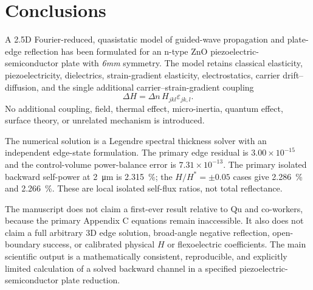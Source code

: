 \section{Conclusions}\label{sec:conclusions}

A 2.5D Fourier-reduced, quasistatic model of guided-wave propagation and
plate-edge reflection has been formulated for an n-type ZnO
piezoelectric-semiconductor plate with \textit{6mm} symmetry. The model retains
classical elasticity, piezoelectricity, dielectrics, strain-gradient elasticity,
electrostatics, carrier drift--diffusion, and the single additional
carrier--strain-gradient coupling
\[
\Delta H=\Delta n\,H_{jkl}\varepsilon_{jk,l}.
\]
No additional coupling, field, thermal effect, micro-inertia, quantum effect,
surface theory, or unrelated mechanism is introduced.

The numerical solution is a Legendre spectral thickness solver with an independent
edge-state formulation. The primary edge residual is \(3.00\times10^{-15}\) and the
control-volume power-balance error is \(7.31\times10^{-13}\). The primary isolated
backward self-power at \SI{2}{\micro\metre} is \SI{2.315}{\percent}; the
\(H/H^*=\pm0.05\) cases give \SI{2.286}{\percent} and \SI{2.266}{\percent}. These
are local isolated self-flux ratios, not total reflectance.

The manuscript does not claim a first-ever result relative to Qu and co-workers,
because the primary Appendix C equations remain inaccessible. It also does not claim
a full arbitrary 3D edge solution, broad-angle negative reflection, open-boundary
success, or calibrated physical \(H\) or flexoelectric coefficients. The main
scientific output is a mathematically consistent, reproducible, and explicitly
limited calculation of a solved backward channel in a specified piezoelectric-semiconductor
plate reduction.
